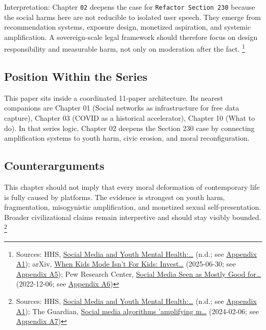 \documentclass[
  american,
  11pt,
  letterpaper,
]{article}
\begin{document}
Interpretation: Chapter \texttt{02} deepens the case for
\texttt{Refactor\ Section\ 230} because the social harms here are not
reducible to isolated user speech. They emerge from recommendation
systems, exposure design, monetized aspiration, and systemic
amplification. A sovereign-scale legal framework should therefore focus
on design responsibility and measurable harm, not only on moderation
after the fact. \footnote{Sources: HHS,
  \href{https://www.hhs.gov/surgeongeneral/priorities/youth-mental-health/social-media/index.html}{Social
  Media and Youth Mental Health:\ldots{}} (n.d.; see
  \hyperref[appendix-a1-social-media-and-youth-mental-health-the-u-s-surgeon-general-s-advisory]{Appendix
  A1}); arXiv, \href{https://arxiv.org/abs/2507.00299}{When Kids Mode
  Isn't For Kids: Invest\ldots{}} (2025-06-30; see
  \hyperref[appendix-a5-when-kids-mode-isn-t-for-kids-investigating-tiktok-s-under-13-experience]{Appendix
  A5}); Pew Research Center,
  \href{https://www.pewresearch.org/global/2022/12/06/social-media-seen-as-mostly-good-for-democracy-across-many-nations-but-u-s-is-a-major-outlier/}{Social
  Media Seen as Mostly Good for\ldots{}} (2022-12-06; see
  \hyperref[appendix-a6-social-media-seen-as-mostly-good-for-democracy-across-many-nations-but-u-s-is-a-major-outlier]{Appendix
  A6})}

\subsection{Position Within the
Series}\label{position-within-the-series}

This paper sits inside a coordinated 11-paper architecture. Its nearest
companions are Chapter 01 (Social networks as infrastructure for free
data capture), Chapter 03 (COVID as a historical accelerator), Chapter
10 (What to do). In that series logic, Chapter 02 deepens the Section
230 case by connecting amplification systems to youth harm, civic
erosion, and moral reconfiguration.

\subsection{Counterarguments}\label{counterarguments}

This chapter should not imply that every moral deformation of
contemporary life is fully caused by platforms. The evidence is
strongest on youth harm, fragmentation, misogynistic amplification, and
monetized sexual self-presentation. Broader civilizational claims remain
interpretive and should stay visibly bounded. \footnote{Sources: HHS,
  \href{https://www.hhs.gov/surgeongeneral/priorities/youth-mental-health/social-media/index.html}{Social
  Media and Youth Mental Health:\ldots{}} (n.d.; see
  \hyperref[appendix-a1-social-media-and-youth-mental-health-the-u-s-surgeon-general-s-advisory]{Appendix
  A1}); The Guardian,
  \href{https://www.theguardian.com/media/2024/feb/06/social-media-algorithms-amplifying-misogynistic-content}{Social
  media algorithms 'amplifying m\ldots{}} (2024-02-06; see
  \hyperref[appendix-a7-social-media-algorithms-amplifying-misogynistic-content]{Appendix
  A7})}
\end{document}
